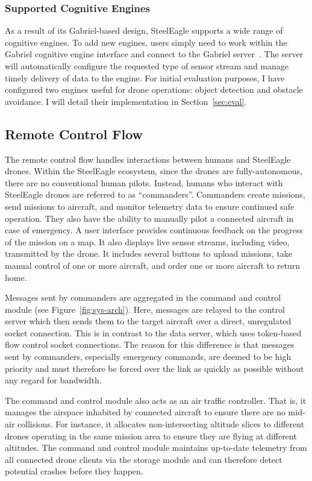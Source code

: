 \subsubsection{Supported Cognitive Engines}
As a result of its Gabriel-based design, SteelEagle supports a wide range of cognitive engines. To add new engines, users simply need to work within the Gabriel cognitive engine interface and connect to the Gabriel server~\cite{Ha2014}. The server will automatically configure the requested type of sensor stream and manage timely delivery of data to the engine. For initial evaluation purposes, I have configured two engines useful for drone operations: object detection and obstacle avoidance. I will detail their implementation in Section~\ref{sec:eval}.

\subsection{Remote Control Flow}
The remote control flow handles interactions between humans and SteelEagle drones. Within the SteelEagle ecosystem, since the drones are fully-autonomous, there are no conventional human pilots. Instead, humans who interact with SteelEagle drones are referred to as ``commanders''. Commanders create missions, send missions to aircraft, and monitor telemetry data to ensure continued safe operation. They also have the ability to manually pilot a connected aircraft in case of emergency. A user interface provides continuous feedback on the progress of the mission on a map.  It also displays live sensor streams, including video, transmitted by the drone. It includes several buttons to upload missions, take manual control of one or more aircraft, and order one or more aircraft to return home.

Messages sent by commanders are aggregated in the command and control module (see Figure~\ref{fig:sys-arch}). Here, messages are relayed to the control server which then sends them to the target aircraft over a direct, unregulated socket connection. This is in contrast to the data server, which uses token-based flow control socket connections. The reason for this difference is that messages sent by commanders, especially emergency commands, are deemed to be high priority and must therefore be forced over the link as quickly as possible without any regard for bandwidth.

The command and control module also acts as an air traffic controller. That is, it manages the airspace inhabited by connected aircraft to ensure there are no mid-air collisions. For instance, it allocates non-intersecting altitude slices to different drones operating in the same mission area to ensure they are flying at different altitudes. The command and control module maintains up-to-date telemetry from all connected drone clients via the storage module and can therefore detect potential crashes before they happen.

